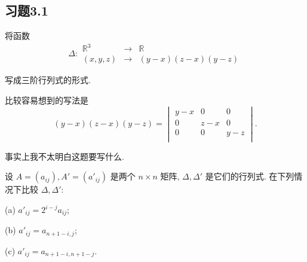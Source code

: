 \documentclass{ctexart}
\begin{document}
\subsection{习题3.1}
\begin{exercise}%
    将函数
    \[\Delta:\begin{array}{rcl}
        \mathbb{R}^3 & \to & \mathbb{R} \\
        (x,y,z) & \to & (y-x)(z-x)(y-z)
    \end{array}\]

    写成三阶行列式的形式.
\end{exercise}
\begin{solution}
    比较容易想到的写法是
    \[(y-x)(z-x)(y-z)=\begin{vmatrix}
        y-x & 0 & 0 \\
        0 & z-x & 0 \\
        0 & 0 & y-z \\
    \end{vmatrix}.\]
\end{solution}
\begin{note}
    事实上我不太明白这题要写什么.
\end{note}
\begin{exercise}%
    设 $A=(a_{ij}),A'=(a'_{ij})$ 是两个 $n\times n$ 矩阵, $\Delta,\Delta'$ 是它们的行列式. 在下列情况下比较 $\Delta,\Delta'$:

    (a) $a'_{ij}=2^{i-j}a_{ij}$;

    (b) $a'_{ij}=a_{n+1-i,j}$;

    (c) $a'_{ij}=a_{n+1-i,n+1-j}$.
\end{exercise}
\end{document}
